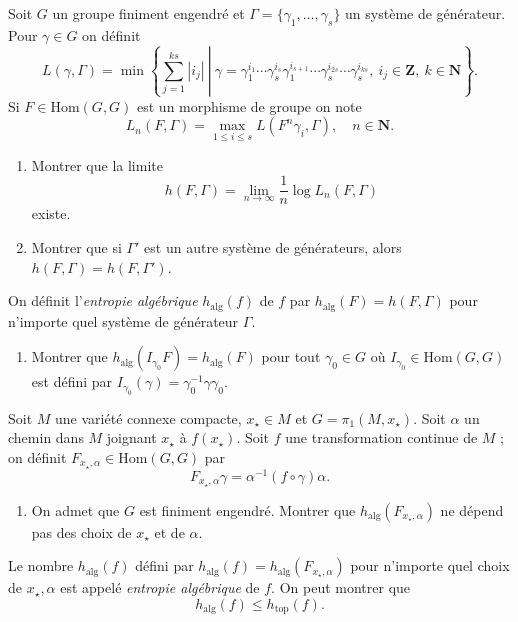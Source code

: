 \documentclass[a4paper,10pt,openany]{article}
\theoremstyle{plain}
\theoremstyle{definition}
\newcommand{\Z}{\mathbf{Z}}
\newcommand{\N}{\mathbf{N}}
\begin{document}
 \vspace{1.5mm} 

\noindent Soit $G$ un groupe finiment engendr\'e et $\Gamma = \{\gamma_1, \dots, \gamma_s\}$ un syst\`eme de g\'en\'erateur. Pour $\gamma \in G$ on d\'efinit
$$
L(\gamma, \Gamma) = \min \left\{\left. \sum_{j=1}^{ks}|i_j|~\right| ~\gamma = \gamma_1^{i_1} \cdots \gamma_s^{i_s} \gamma_1^{i_{s+1}} \cdots \gamma_s^{i_{2s}} \cdots \gamma_s^{i_{ks}}, ~i_j \in \Z,~ k \in \N\right\}.
$$
Si $F \in \mathrm{Hom}(G,G)$ est un morphisme de groupe on note
$$
L_n(F,\Gamma) = \max_{1 \leq i \leq s} L(F^n\gamma_i, \Gamma), \quad n \in \N.
$$
\begin{enumerate}
\item Montrer que la limite
$$h(F, \Gamma) = \lim_{n \to \infty} \frac{1}{n} \log L_n(F, \Gamma)$$
existe. 
\item Montrer que si $\Gamma'$ est un autre syst\`eme de g\'en\'erateurs, alors $h(F, \Gamma) = h(F, \Gamma')$. 
\end{enumerate}
\noindent On d\'efinit l'\textit{entropie alg\'ebrique} $h_\mathrm{alg}(f)$ de $f$ par $h_\mathrm{alg}(F) = h(F,\Gamma)$ pour n'importe quel syst\`eme de g\'en\'erateur $\Gamma$.
\begin{enumerate}[resume]
\item Montrer que $h_\mathrm{alg}(I_{\gamma_0} F) = h_\mathrm{alg}(F)$ pour tout $\gamma_0 \in G$ o\`u $I_{\gamma_0} \in \mathrm{Hom}(G,G)$ est d\'efini par $I_{\gamma_0}(\gamma) = \gamma_0^{-1} \gamma \gamma_0.$
\end{enumerate}
\noindent Soit $M$ une vari\'et\'e connexe compacte, $x_\star \in M$ et $G = \pi_1(M, x_\star)$. Soit $\alpha$ un chemin dans $M$ joignant $x_\star$ \`a $f(x_\star).$ Soit $f$ une transformation continue de $M$ ; on d\'efinit $F_{x_\star, \alpha} \in \mathrm{Hom}(G,G)$ par
$$
F_{x_\star, \alpha} \gamma = \alpha^{-1} (f \circ\gamma) \alpha.
$$
\begin{enumerate}[resume]
\item On admet que $G$ est finiment engendr\'e. Montrer que $h_\mathrm{alg}(F_{x_\star, \alpha})$ ne d\'epend pas des choix de $x_\star$ et de $\alpha$. 
\end{enumerate}
\noindent Le nombre $h_\mathrm{alg}(f)$ d\'efini par $h_\mathrm{alg}(f) = h_\mathrm{alg}(F_{x_\star, \alpha})$ pour n'importe quel choix de $x_\star, \alpha$ est appel\'e \textit{entropie alg\'ebrique} de $f$. On peut montrer que 
$$
h_\mathrm{alg}(f) \leq h_\mathrm{top}(f).
$$
\end{document}
